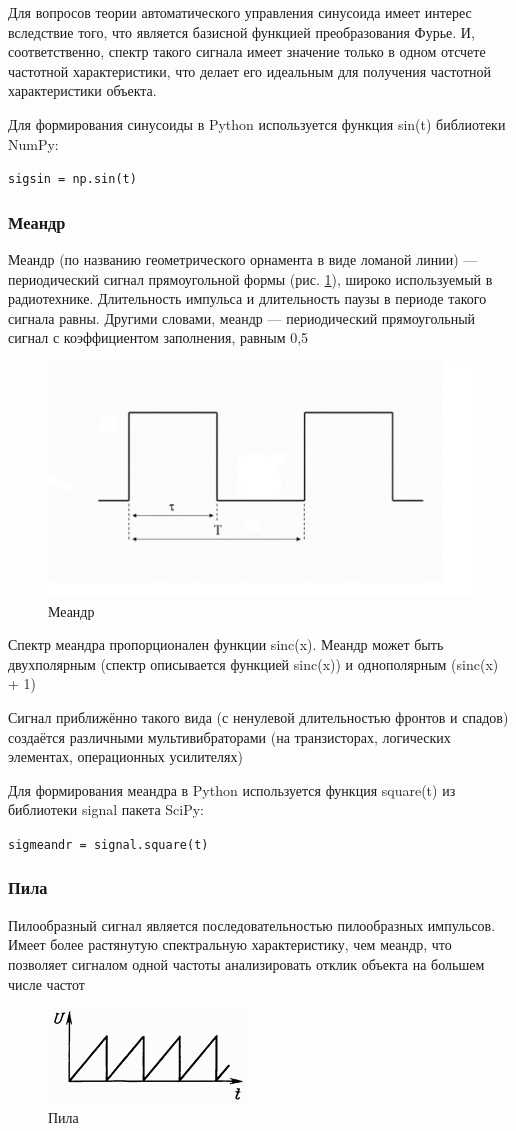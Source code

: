 Для вопросов теории автоматического управления синусоида имеет интерес вследствие того, 
что является базисной функцией преобразования Фурье. И, соответственно, 
спектр такого сигнала имеет значение только в одном отсчете частотной характеристики, 
что делает его идеальным для получения частотной характеристики объекта.

Для формирования синусоиды в Python используется функция sin(t) библиотеки NumPy:

\texttt{sig\textunderscore sin = np.sin(t)}
\subsubsection{Меандр}
Меандр (по названию геометрического орнамента в виде ломаной линии) — периодический сигнал
прямоугольной формы (рис. \ref{fig:2}), широко используемый в радиотехнике. Длительность импульса
и длительность паузы в периоде такого сигнала равны. Другими словами, меандр — периодический
прямоугольный сигнал с коэффициентом заполнения, равным 0,5
\begin{figure}[H]
	\centering
	\includegraphics[width=0.5\linewidth]{body/templates/meandr.png}
	\caption{Меандр}
	\label{fig:2}
\end{figure}

Спектр меандра пропорционален функции sinc(x). Меандр может быть двухполярным (спектр описывается
функцией sinc(x)) и однополярным (sinc(x) + 1)

Сигнал приближённо такого вида (с ненулевой длительностью фронтов и спадов) создаётся различными
мультивибраторами (на транзисторах, логических элементах, операционных усилителях)

Для формирования меандра в Python используется функция square(t) из библиотеки signal пакета SciPy:

\texttt{sig\textunderscore meandr = signal.square(t)}
\subsubsection{Пила}
Пилообразный сигнал является последовательностью пилообразных импульсов. Имеет более растянутую
спектральную характеристику, чем меандр, что позволяет сигналом одной частоты анализировать
отклик объекта на большем числе частот
\begin{figure}[H]
	\centering
	\includegraphics[width=0.5\linewidth]{body/templates/sawtooth.png}
	\caption{Пила}
	\label{fig:3}
\end{figure}

